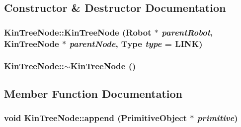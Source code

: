 \subsection{Constructor \& Destructor Documentation}
\hypertarget{class_robot_model_1_1_kin_tree_node_a48236a64352c2187db6193069d598c86}{
\subsubsection[{KinTreeNode}]{\setlength{\rightskip}{0pt plus 5cm}KinTreeNode::KinTreeNode ({\bf Robot} $\ast$ {\em parentRobot}, \/  {\bf KinTreeNode} $\ast$ {\em parentNode}, \/  {\bf Type} {\em type} = {\ttfamily LINK})}}
\label{class_robot_model_1_1_kin_tree_node_a48236a64352c2187db6193069d598c86}
\hypertarget{class_robot_model_1_1_kin_tree_node_a629cf524084ee233b402674cb371195f}{
\subsubsection[{$\sim$KinTreeNode}]{\setlength{\rightskip}{0pt plus 5cm}KinTreeNode::$\sim$KinTreeNode ()}}
\label{class_robot_model_1_1_kin_tree_node_a629cf524084ee233b402674cb371195f}


\subsection{Member Function Documentation}
\hypertarget{class_robot_model_1_1_kin_tree_node_af043fc57074a449364d2a6ec09be46a3}{
\subsubsection[{append}]{\setlength{\rightskip}{0pt plus 5cm}void KinTreeNode::append ({\bf PrimitiveObject} $\ast$ {\em primitive})}}
\label{class_robot_model_1_1_kin_tree_node_af043fc57074a449364d2a6ec09be46a3}


